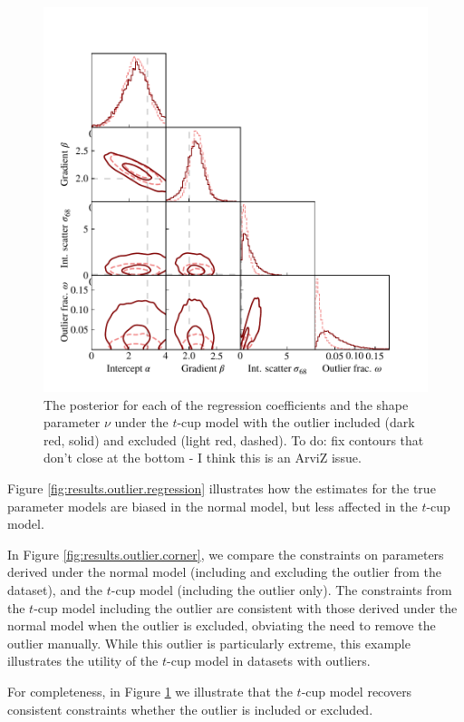\documentclass[fleqn,usenatbib]{mnras}
\begin{document}
\begin{figure}
    \includegraphics[width=\columnwidth]{graphics/corner_outlier_tcup.pdf}
    \caption{The posterior for each of the regression coefficients and the shape
    parameter $\nu$ under the $t$-cup model with the outlier included (dark red,
    solid) and excluded (light red, dashed). {\color{red} To do: fix contours
    that don't close at the bottom - I think this is an ArviZ issue.}}
    \label{fig:results.outlier.tcup}
\end{figure}

Figure \ref{fig:results.outlier.regression} illustrates how the estimates for
the true parameter models are biased in the normal model, but less affected in
the $t$-cup model.

In Figure \ref{fig:results.outlier.corner}, we compare the constraints on
parameters derived under the normal model (including and excluding the outlier
from the dataset), and the $t$-cup model (including the outlier only). The
constraints from the $t$-cup model including the outlier are consistent with
those derived under the normal model when the outlier is excluded, obviating the
need to remove the outlier manually. While this outlier is particularly extreme,
this example illustrates the utility of the $t$-cup model in datasets with
outliers.

For completeness, in Figure \ref{fig:results.outlier.tcup} we illustrate that
the $t$-cup model recovers consistent constraints whether the outlier is
included or excluded.
\end{document}

